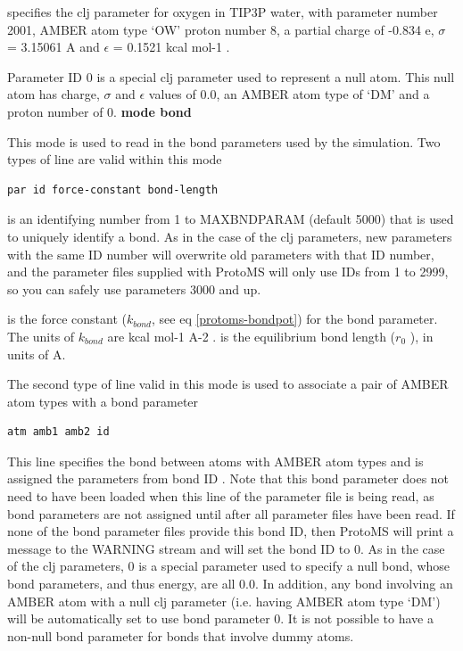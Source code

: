 \documentclass[letterpaper,10pt,english]{manual}
\begin{document}
specifies the clj parameter for oxygen in TIP3P water, with parameter number 2001, AMBER atom type ‘OW’ proton number 8, a partial charge of -0.834 \textbar{}e\textbar{}, \(\sigma\) = 3.15061 A and \(\epsilon\) = 0.1521 kcal mol-1 .

Parameter ID 0 is a special clj parameter used to represent a null atom. This null atom has charge, $\sigma$ and $\epsilon$ values of 0.0, an AMBER atom type of ‘DM’ and a proton number of 0.
\textbf{mode bond}

This mode is used to read in the bond parameters used by the simulation. Two types of line are valid within this mode

\begin{Verbatim}[commandchars=@\[\]]
par id force-constant bond-length
\end{Verbatim}

 is an identifying number from 1 to MAXBNDPARAM (default 5000) that is used to uniquely identify a bond. As in the case of the clj parameters, new parameters with the same ID number will overwrite old parameters with that ID number, and the parameter files supplied with ProtoMS will only use IDs from 1 to 2999, so you can safely use parameters 3000 and up.

 is the force constant ($k_{bond}$, see eq \eqref{protoms-bondpot}) for the bond parameter. The units of $k_{bond}$ are kcal mol-1 A-2 .  is the equilibrium bond length ($r_0$ ), in units of A.

The second type of line valid in this mode is used to associate a pair of AMBER atom types with a bond parameter

\begin{Verbatim}[commandchars=@\[\]]
atm amb1 amb2 id
\end{Verbatim}

This line specifies the bond between atoms with AMBER atom types  and  is assigned the parameters from bond ID . Note that this bond parameter does not need to have been loaded when this line of the parameter file is being read, as bond parameters are not assigned until after all parameter files have been read. If none of the bond parameter files provide this bond ID, then ProtoMS will print a message to the WARNING stream and will set the bond ID to 0. As in the case of the clj parameters, 0 is a special parameter used to specify a null bond, whose bond parameters, and thus energy, are all 0.0. In addition, any bond involving an AMBER atom with a null clj parameter (i.e. having AMBER atom type ‘DM’) will be automatically set to use bond parameter 0. It is not possible to have a non-null bond parameter for bonds that involve dummy atoms.
\end{document}
